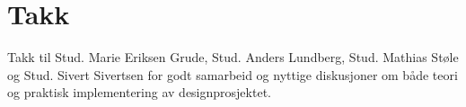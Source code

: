 \section{Takk}
Takk til Stud. Marie Eriksen Grude, Stud. Anders Lundberg, Stud. Mathias Støle  og Stud. Sivert Sivertsen for godt samarbeid og nyttige diskusjoner om både teori og praktisk implementering av designprosjektet.